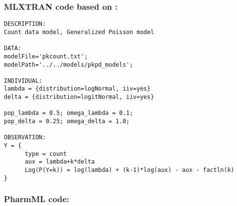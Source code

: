 \myEndLine

\subsubsection{MLXTRAN code based on \cite{Monolix4.0ChatelLavielle}:}

\myStartLine

\begin{lstlisting}
DESCRIPTION:
Count data model, Generalized Poisson model

DATA:
modelFile='pkcount.txt';
modelPath='../../models/pkpd_models';

INDIVIDUAL:
lambda = {distribution=logNormal, iiv=yes}
delta = {distribution=logitNormal, iiv=yes}

pop_lambda = 0.5; omega_lambda = 0.1;
pop_delta = 0.25; omega_delta = 1.0;

OBSERVATION:
Y = {
      type = count
      aux = lambda+k*delta
      Log(P(Y=k)) = log(lambda) + (k-1)*log(aux) - aux - factln(k)
}
\end{lstlisting}

\myEndLine

\subsubsection{PharmML code:}

